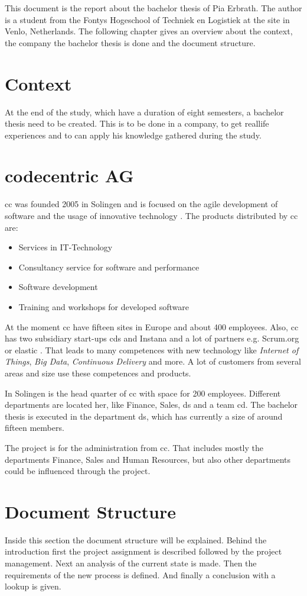 This document is the report about the bachelor thesis of Pia Erbrath. The author is a student from the Fontys Hogeschool of Techniek en Logistiek at the site in Venlo, Netherlands. The following chapter gives an overview about the context, the company the bachelor thesis is done and the document structure.

\section{Context}
At the end of the study, which have a duration of eight semesters, a bachelor thesis need to be created. This is to be done in a company, to get \flqq real\frqq life experiences and to can apply his knowledge gathered during the study.  

\section{codecentric AG}
\Gls{cc} was founded 2005 in Solingen and is focused on the agile development of software and the usage of innovative technology \parencite{codecentric2018unternehmen}. The products distributed by \gls{cc} are: 
\begin{itemize}
	\item Services in \gls{IT}-Technology
	\item Consultancy service for software and performance
	\item Software development
	\item Training and workshops for developed software
\end{itemize}
At the moment \gls{cc} have fifteen sites in Europe and about 400 employees. Also, \gls{cc} has two subsidiary start-ups \glspl{cd} and Instana \parencite{codecentric2018startups} and a lot of partners e.g. Scrum.org or elastic \parencite{codecentric2018partner}.
That leads to many competences with new technology like \textit{Internet of Things}, \textit{Big Data}, \textit{Continuous Delivery} and more.
A lot of customers from several areas and size use these competences and products.

In Solingen is the head quarter of \gls{cc} with space for 200 employees. Different departments are located her, like Finance, Sales, \gls{ds} and a team \gls{cd}.   
The bachelor thesis is executed in the department \gls{ds}, which has currently a size of around fifteen members.

The project is for the administration from \gls{cc}. That includes mostly the departments Finance, Sales and Human Resources, but also other departments could be influenced through the project.

\section{Document Structure}
Inside this section the document structure will be explained. Behind the introduction first the project assignment is described followed by the project management. Next an analysis of the current state is made. Then the requirements of the new process is defined. And finally a conclusion with a lookup is given.